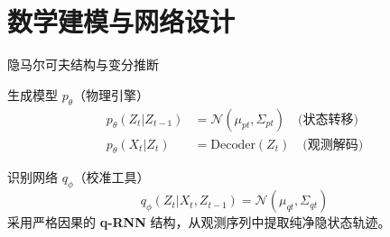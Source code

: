 \documentclass[10pt,aspectratio=1610]{beamer}
\begin{document}
\section{数学建模与网络设计}

\begin{frame}{隐马尔可夫结构与变分推断}
    \begin{block}{生成模型 $p_\theta$（物理引擎）}
        \begin{align}
            p_\theta(Z_t | Z_{t-1}) & = \mathcal{N}(\mu_{pt}, \Sigma_{pt}) \quad \text{(状态转移)} \\
            p_\theta(X_t | Z_t)     & = \text{Decoder}(Z_t) \quad \text{(观测解码)}
        \end{align}
    \end{block}
    \begin{alertblock}{识别网络 $q_\phi$（校准工具）}
        \begin{equation}
            q_\phi(Z_t | X_{t},Z_{t-1}) = \mathcal{N}(\mu_{qt}, \Sigma_{qt})
        \end{equation}
        采用严格因果的 \textbf{q-RNN} 结构，从观测序列中提取纯净隐状态轨迹。
    \end{alertblock}
\end{frame}

\end{document}
